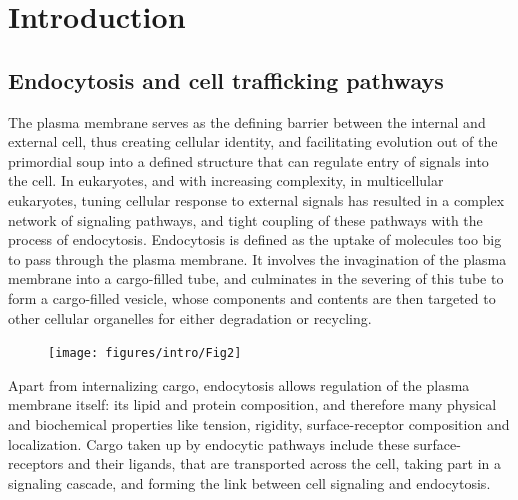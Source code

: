 \chapter{Introduction} %
\graphicspath{ {/Users/kaksonenlab/Desktop/figures/} }
\label{Ch:Intro} %

\section{Endocytosis and cell trafficking pathways}
The plasma membrane serves as the defining barrier between the internal and external cell, thus creating cellular identity, and facilitating evolution out of the primordial soup into a defined structure that can regulate entry of signals into the cell. In eukaryotes, and with increasing complexity, in multicellular eukaryotes, tuning cellular response to external signals has resulted in a complex network of signaling pathways, and tight coupling of these pathways with the process of endocytosis. Endocytosis is defined as the uptake of molecules too big to pass through the plasma membrane. It involves the invagination of the plasma membrane into a cargo-filled tube, and culminates in the severing of this tube to form a cargo-filled vesicle, whose components and contents are then targeted to other cellular organelles for either degradation or recycling. 


\begin{figure}[H]
	\centering
	\texttt{[image: figures/intro/Fig2]}
\end{figure}

Apart from internalizing cargo, endocytosis allows regulation of the plasma membrane itself: its lipid and protein composition, and therefore many physical and biochemical properties like tension, rigidity, surface-receptor composition and localization. Cargo taken up by endocytic pathways include these surface-receptors and their ligands, that are transported across the cell, taking part in a signaling cascade, and forming the link between cell signaling and endocytosis.


